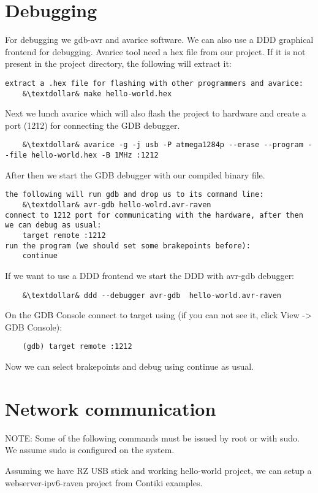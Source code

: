 \documentclass{article}
\begin{document}
\section{Debugging}
For debugging we gdb-avr and avarice software. We can also use a DDD graphical frontend for debugging.
Avarice tool need a hex file from our project.
If it is not present in the project directory, the following will extract it:
\begin{lstlisting}
extract a .hex file for flashing with other programmers and avarice:
	&\textdollar& make hello-world.hex
\end{lstlisting}

Next we lunch avarice which will also flash the project to hardware and create a port (1212) for connecting the GDB debugger.
\begin{lstlisting}
	&\textdollar& avarice -g -j usb -P atmega1284p --erase --program --file hello-world.hex -B 1MHz :1212
\end{lstlisting}
After then we start the GDB debugger with our compiled binary file.
\begin{lstlisting}
the following will run gdb and drop us to its command line:
	&\textdollar& avr-gdb hello-wolrd.avr-raven
connect to 1212 port for communicating with the hardware, after then we can debug as usual:
	target remote :1212
run the program (we should set some brakepoints before):
	continue
\end{lstlisting}
If we want to use a DDD frontend we start the DDD with avr-gdb debugger:
\begin{lstlisting}
	&\textdollar& ddd --debugger avr-gdb  hello-world.avr-raven
\end{lstlisting}
On the GDB Console connect to target using (if you can not see it, click View -> GDB Console):
\begin{lstlisting}
	(gdb) target remote :1212
\end{lstlisting}
Now we can select brakepoints and debug using continue as usual.


\section{Network communication}
NOTE: Some of the following commands must be issued by root or with sudo. We assume sudo is configured on the system.

Assuming we have RZ USB stick and working hello-world project, we can setup a webserver-ipv6-raven project from Contiki examples.
\end{document}
